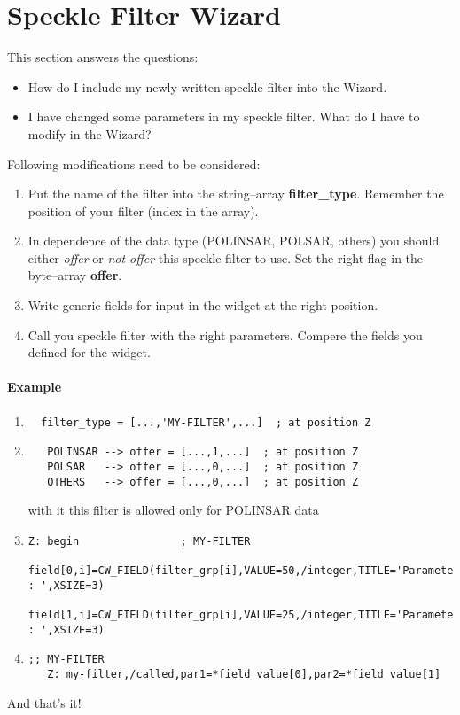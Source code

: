 \section{Speckle Filter Wizard}
This section answers the questions:
\begin{itemize}
  \item How do I include my newly written speckle filter into the Wizard.
  \item I have changed some parameters in my speckle filter. What do I have to
    modify in the Wizard?
\end{itemize}
Following modifications need to be considered:
\begin{enumerate}
  \item Put the name of the filter into the string--array
    \textbf{filter\_type}. Remember the position of your filter (index in the array).
  \item In dependence of the data type (POLINSAR, POLSAR, others) you should
    either \emph{offer} or \emph{not offer} this speckle filter to use. Set the right
    flag in the byte--array \textbf{offer}.
  \item Write generic fields for input in the widget at the right position.
  \item Call you speckle filter with the right parameters. Compere the fields
    you defined for the widget.
\end{enumerate}

\paragraph{Example}

\begin{enumerate}
  \item
\begin{verbatim}
  filter_type = [...,'MY-FILTER',...]  ; at position Z
\end{verbatim}
  \item
\begin{verbatim}
   POLINSAR --> offer = [...,1,...]  ; at position Z
   POLSAR   --> offer = [...,0,...]  ; at position Z
   OTHERS   --> offer = [...,0,...]  ; at position Z
\end{verbatim}
   with it this filter is allowed only for POLINSAR data
  \item 
\begin{verbatim}
Z: begin                ; MY-FILTER
   field[0,i]=CW_FIELD(filter_grp[i],VALUE=50,/integer,TITLE='Parameter1 : ',XSIZE=3)
   field[1,i]=CW_FIELD(filter_grp[i],VALUE=25,/integer,TITLE='Parameter2 : ',XSIZE=3)
\end{verbatim}
   \item
\begin{verbatim}
;; MY-FILTER
   Z: my-filter,/called,par1=*field_value[0],par2=*field_value[1]
\end{verbatim}
   \end{enumerate}
And that's it!

